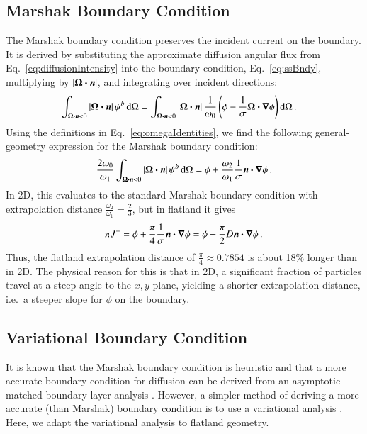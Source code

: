 \documentclass{anstrans}
\begin{document}
\subsection{Marshak Boundary Condition}
The Marshak boundary condition preserves the incident
current on the boundary. It is derived by substituting the approximate diffusion
angular flux from Eq.~\eqref{eq:diffusionIntensity} into the boundary condition,
Eq.~\eqref{eq:ssBndy}, multiplying by $\left| \bm{\Omega}\bm{\cdot} \bm{n} \right|$, and integrating over
incident directions:
\begin{align*}
\int_{\bm{\Omega}\bm{\cdot} \bm{n} < 0 } \left| \bm{\Omega}\bm{\cdot} \bm{n} \right|
\psi^b \mathop{}\!\mathrm{d}\Omega
 &= 
\int_{\bm{\Omega}\bm{\cdot} \bm{n} < 0 } \left| \bm{\Omega}\bm{\cdot} \bm{n} \right| 
 \frac{1}{\omega_0} \left( \phi - \frac{1}{\sigma}
  \bm{\Omega} \bm{\cdot} \bm{\nabla} \phi \right)
  \mathop{}\!\mathrm{d}\Omega \,.
\end{align*}
Using the definitions in Eq.~\eqref{eq:omegaIdentities}, we
find the following general-geometry expression for the Marshak boundary
condition:
\begin{equation} \label{eq:marshak}
\frac{2\omega_0}{\omega_1}
\int_{\bm{\Omega}\bm{\cdot} \bm{n} < 0 } \left| \bm{\Omega}\bm{\cdot} \bm{n} \right|
\psi^b \mathop{}\!\mathrm{d}\Omega
=
\phi + \frac{\omega_2}{\omega_1}\frac{1}{\sigma} \bm{n} \bm{\cdot} \bm{\nabla} \phi \,.
\end{equation}
In 2D, this evaluates to the standard Marshak boundary condition with
extrapolation distance $\frac{\omega_2}{\omega_1} = \frac23$, but in flatland
it gives
\begin{equation*}
\pi J^{-} = \phi + \frac{\pi}{4}\frac{1}{\sigma} \bm{n} \bm{\cdot} \bm{\nabla} \phi
= \phi + \frac{\pi}{2} D \bm{n} \bm{\cdot} \bm{\nabla} \phi\,.
\end{equation*}
Thus, the flatland extrapolation distance of $\frac{\pi}{4} \approx 0.7854$
is about 18\% longer than in 2D.
The physical reason for this is that in 2D, a significant fraction of
particles travel at a steep angle to the $x,y$-plane, yielding a
shorter extrapolation distance, i.e.~a steeper slope for $\phi$ on the boundary.

\subsection{Variational Boundary Condition}
It is known that the Marshak boundary condition is heuristic and that
a more accurate boundary condition for diffusion can be derived from an
asymptotic matched boundary layer analysis \cite{Mal1991}. However, a simpler
method of deriving a more accurate (than Marshak) boundary condition is to use
a variational analysis \cite{Mal1991}. Here, we adapt the variational analysis
to flatland geometry.
\end{document}
